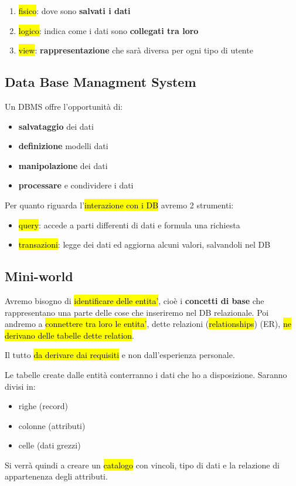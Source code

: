 \begin{enumerate}
	\item \hl{fisico}: dove sono \textbf{salvati i dati}
	\item \hl{logico}: indica come i dati sono \textbf{collegati tra loro}
	\item \hl{view}: \textbf{rappresentazione} che sarà diversa per ogni tipo di utente
\end{enumerate}


\subsection{Data Base Managment System}

Un DBMS offre l'opportunità di:

\begin{itemize}
	\item \textbf{salvataggio} dei dati
	\item \textbf{definizione} modelli dati
	\item \textbf{manipolazione} dei dati
	\item \textbf{processare} e condividere i dati
\end{itemize}

Per quanto riguarda l'\hl{interazione con i DB} avremo 2 strumenti:

\begin{itemize}
	\item \hl{query}: accede a parti differenti di dati e formula una richiesta
	\item \hl{transazioni}: legge dei dati ed aggiorna alcuni valori, salvandoli nel DB
\end{itemize}


\subsection{Mini-world}

Avremo bisogno di \hl{identificare delle entita'}, cioè i \textbf{concetti di base} che rappresentano una parte delle cose che inseriremo nel DB relazionale. Poi andremo a \hl{connettere tra loro le entita'}, dette relazioni (\hl{relationships}) (ER), \hl{ne derivano delle tabelle dette relation}.

Il tutto \hl{da derivare dai requisiti} e non dall'esperienza personale.

Le tabelle create dalle entità conterranno i dati che ho a disposizione. Saranno divisi in:

\begin{itemize}
	\item righe (record)
	\item colonne (attributi)
	\item celle (dati grezzi)
\end{itemize}


Si verrà quindi a creare un \hl{catalogo} con vincoli, tipo di dati e la relazione di appartenenza degli attributi.
